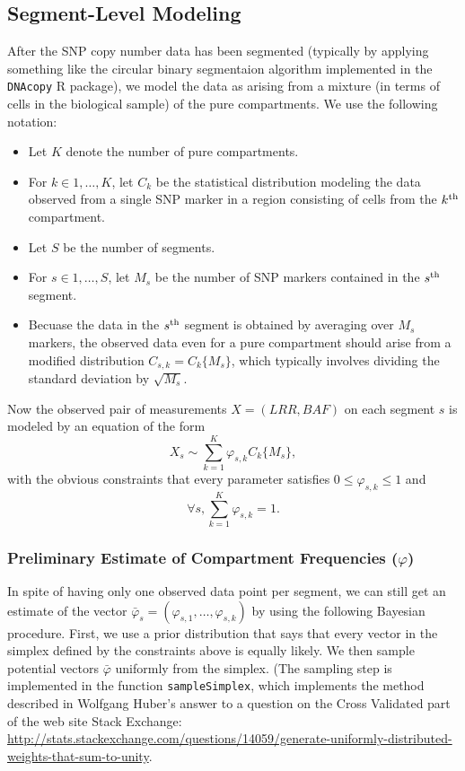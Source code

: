 \documentclass{article}
\begin{document}
\subsection{Segment-Level Modeling}
After the SNP copy number data has been segmented (typically by
applying something like the circular binary segmentaion algorithm
implemented in the \texttt{DNAcopy} R package), we model the data as
arising from a mixture (in terms of cells in the biological sample) of
the pure compartments.  We use the following notation:
\begin{itemize}
\item Let $K$ denote the number of pure compartments.
\item For $k \in 1,\ldots,K$, let $C_k$ be the statistical
  distribution modeling the data observed from a single SNP marker
  in a region consisting of cells from the $k^{\rm th}$ compartment.
\item Let $S$ be the number of segments.
\item For $s \in 1,\ldots,S$, let $M_s$ be the number of SNP markers
  contained in the $s^{\rm th}$ segment.
\item Becuase the data in the $s^{\rm th}$ segment is obtained by
  averaging over $M_s$ markers, the observed data even for a pure
  compartment should arise from a modified distribution 
  $C_{s,k} = C_k\{M_s\}$, which typically involves dividing the
  standard deviation by $\sqrt{M_s}$. 
\end{itemize}

Now the observed pair of measurements $X = (LRR, BAF)$ on each segment
$s$ is modeled by an equation of the form
$$ X_s \sim \sum_{k=1}^K \varphi_{s,k} C_k\{M_s\}, $$
with the obvious constraints that every parameter satisfies $ 0 \le
\varphi_{s,k} \le 1$ and
$$\forall s, \sum_{k=1}^K \varphi_{s,k} = 1. $$

\subsubsection{Preliminary Estimate of Compartment Frequencies ($\varphi$)}
In spite of having only one observed data point per segment, we can
still get an estimate of the vector $\bar\varphi_s = (\varphi_{s,1},
\ldots, \varphi_{s,k})$ by using the following Bayesian procedure.
First, we use a prior distribution that says that every vector in the
simplex defined by the constraints above is equally likely.  We then
sample potential vectors $\bar\varphi$ uniformly from the
simplex. (The sampling step is implemented in the function
\texttt{sampleSimplex}, which implements the method described in
Wolfgang Huber's answer to a question on the Cross Validated part of
the web site Stack Exchange:
\url{http://stats.stackexchange.com/questions/14059/generate-uniformly-distributed-weights-that-sum-to-unity}.
\end{document}
